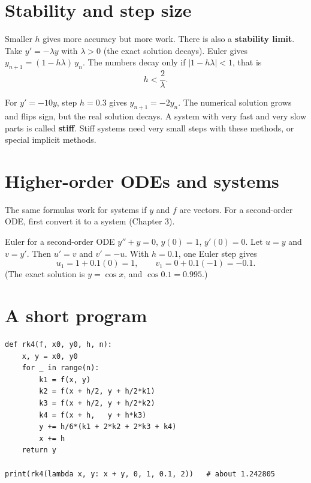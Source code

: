 \section{Stability and step size}

Smaller $h$ gives more accuracy but more work. There is also a \textbf{stability limit}. Take $y' = -\lambda y$ with $\lambda>0$ (the exact solution decays). Euler gives $y_{n+1} = (1 - h\lambda)\,y_n$. The numbers decay only if $|1 - h\lambda| < 1$, that is
\[ h < \frac{2}{\lambda}. \]

\begin{notebox}
For $y' = -10y$, step $h=0.3$ gives $y_{n+1} = -2y_n$. The numerical solution grows and flips sign, but the real solution decays. A system with very fast and very slow parts is called \textbf{stiff}. Stiff systems need very small steps with these methods, or special implicit methods.
\end{notebox}

\section{Higher-order ODEs and systems}

The same formulas work for systems if $y$ and $f$ are vectors. For a second-order ODE, first convert it to a system (Chapter 3).

\begin{examplebox}{Euler for a second-order ODE}
$y'' + y = 0$, $y(0)=1$, $y'(0)=0$. Let $u = y$ and $v = y'$. Then $u' = v$ and $v' = -u$. With $h=0.1$, one Euler step gives
\[ u_1 = 1 + 0.1(0) = 1, \qquad v_1 = 0 + 0.1(-1) = -0.1 . \]
(The exact solution is $y=\cos x$, and $\cos 0.1 = 0.995$.)
\end{examplebox}

\section{A short program}

\begin{center}
\begin{minipage}{0.92\textwidth}
\small
\begin{verbatim}
def rk4(f, x0, y0, h, n):
    x, y = x0, y0
    for _ in range(n):
        k1 = f(x, y)
        k2 = f(x + h/2, y + h/2*k1)
        k3 = f(x + h/2, y + h/2*k2)
        k4 = f(x + h,   y + h*k3)
        y += h/6*(k1 + 2*k2 + 2*k3 + k4)
        x += h
    return y

print(rk4(lambda x, y: x + y, 0, 1, 0.1, 2))   # about 1.242805
\end{verbatim}
\end{minipage}
\end{center}

